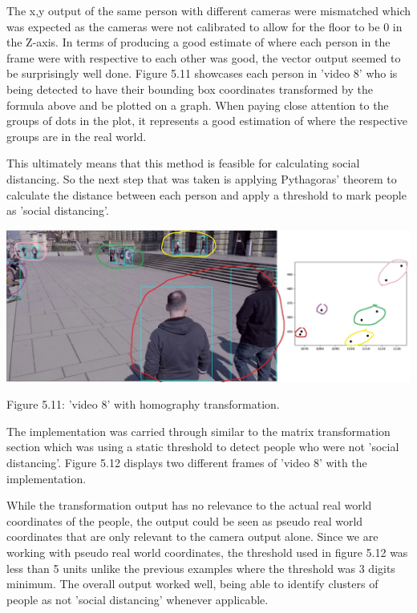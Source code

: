 \documentclass[12pt]{report}
\begin{document}
\vspace{2mm}

The x,y output of the same person with different cameras were mismatched which was expected as the cameras were not calibrated to allow for the floor to be 0 in the Z-axis. In terms of producing a good estimate of where each person in the frame were with respective to each other was good, the vector output seemed to be surprisingly well done. Figure 5.11 showcases each person in 'video 8'  who is being detected to have their bounding box coordinates transformed by the formula above and be plotted on a graph. When paying close attention to the groups of dots in the plot, it represents a good estimation of where the respective groups are in the real world.

\vspace{2mm}

This ultimately means that this method is feasible for calculating social distancing. So the next step that was taken is applying Pythagoras' theorem to calculate the distance between each person and apply a threshold to mark people as 'social distancing'.



\begin{center}
	\includegraphics[width=150mm]{./images/appendix/HomographyMapping.JPG}
	
	
	{\footnotesize Figure 5.11: 'video 8' with homography transformation.}
\end{center}

The implementation was carried through similar to the matrix transformation section which was using a static threshold to detect people who were not 'social distancing'. Figure 5.12 displays two different frames of 'video 8' with the implementation.

\vspace{2mm}

While the transformation output has no relevance to the actual real world coordinates of the people, the output could be seen as pseudo real world coordinates that are only relevant to the camera output alone. Since we are working with pseudo real world coordinates, the threshold used in figure 5.12 was less than 5 units unlike the previous examples where the threshold was 3 digits minimum. The overall output worked well, being able to identify clusters of people as not 'social distancing' whenever applicable.
\end{document}
